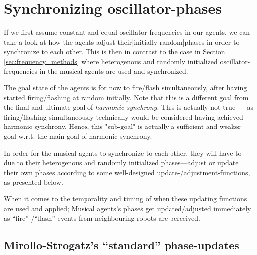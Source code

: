 	
	
	
	
	
	
	
	
	
	




\section{Synchronizing oscillator-phases}
\label{sec:phase_methods}

	If we first assume constant and equal oscillator-frequencies in our agents, we can take a look at how the agents adjust their|initially random|phases in order to synchronize to each other. This is then in contrast to the case in Section \ref{sec:frequency_methods} where heterogenous and randomly initialized oscillator-frequencies in the musical agents are used and synchronized.
	
	The goal state of the agents is for now to fire/flash simultaneously, after having started firing/flashing at random initially. Note that this is a different goal from the final and ultimate goal of \textit{harmonic synchrony}. This is actually not true — as firing/flashing simultaneously technically would be considered having achieved harmonic synchrony. Hence, this "sub-goal" is actually a sufficient and weaker goal w.r.t. the main goal of harmonic synchrony.
	
	In order for the musical agents to synchronize to each other, they will have to—due to their heterogenous and randomly initialized phases—adjust or update their own phases according to some well-designed update-/adjustment-functions, as presented below.
	
	When it comes to the temporality and timing of when these updating functions are used and applied; Musical agents's phases get updated/adjusted immediately as ``fire''-/``flash''-events from neighbouring robots are perceived.

	
	
	\subsection{Mirollo-Strogatz's ``standard'' phase-updates} %
	
